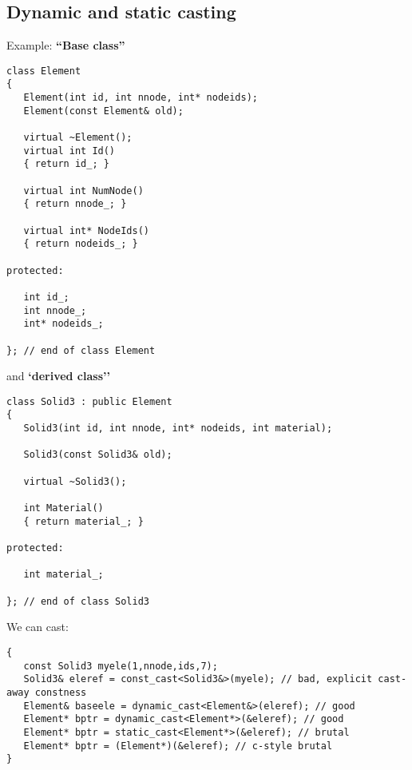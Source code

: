\subsection{Dynamic and static casting}
Example: \textbf{``Base class''}\\
\begin{boxedminipage}{\linewidth}
\begin{verbatim}
class Element
{
   Element(int id, int nnode, int* nodeids);
   Element(const Element& old);

   virtual ~Element();
   virtual int Id()
   { return id_; }

   virtual int NumNode()
   { return nnode_; }

   virtual int* NodeIds()
   { return nodeids_; }

protected:

   int id_;
   int nnode_;
   int* nodeids_;
   
}; // end of class Element
\end{verbatim}
\end{boxedminipage}
and \textbf{`derived class''}\\
\begin{boxedminipage}{\linewidth}
\begin{verbatim}
class Solid3 : public Element
{
   Solid3(int id, int nnode, int* nodeids, int material);

   Solid3(const Solid3& old);

   virtual ~Solid3();

   int Material()
   { return material_; }

protected:

   int material_;

}; // end of class Solid3
\end{verbatim}
\end{boxedminipage}
We can cast:\\
\begin{boxedminipage}{\linewidth}
\begin{verbatim}
{
   const Solid3 myele(1,nnode,ids,7);
   Solid3& eleref = const_cast<Solid3&>(myele); // bad, explicit cast-away constness
   Element& baseele = dynamic_cast<Element&>(eleref); // good
   Element* bptr = dynamic_cast<Element*>(&eleref); // good
   Element* bptr = static_cast<Element*>(&eleref); // brutal
   Element* bptr = (Element*)(&eleref); // c-style brutal
}
\end{verbatim}
\end{boxedminipage}

